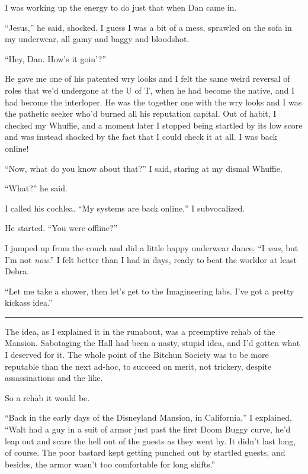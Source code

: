I was working up the energy to do just that when Dan came in.

“Jesus,” he said, shocked. I guess I was a bit of a mess, sprawled
on the sofa in my underwear, all gamy and baggy and bloodshot.

“Hey, Dan. How's it goin'?”

He gave me one of his patented wry looks and I felt the same weird
reversal of roles that we'd undergone at the U of T, when he had
become the native, and I had become the interloper. He was the
together one with the wry looks and I was the pathetic seeker who'd
burned all his reputation capital. Out of habit, I checked my
Whuffie, and a moment later I stopped being startled by its low
score and was instead shocked by the fact that I could check it at
all. I was back online!

“Now, what do you know about that?” I said, staring at my dismal
Whuffie.

“What?” he said.

I called his cochlea. “My systems are back online,” I
subvocalized.

He started. “You were offline?”

I jumped up from the couch and did a little happy underwear dance.
“I \emph{was}, but I'm not \emph{now}.” I felt better than I had in
days, ready to beat the world{\dash}or at least Debra.

“Let me take a shower, then let's get to the Imagineering labs.
I've got a pretty kickass idea.”

\begin{center}\rule{1in}{0.4pt}\end{center}

The idea, as I explained it in the runabout, was a preemptive rehab
of the Mansion. Sabotaging the Hall had been a nasty, stupid idea,
and I'd gotten what I deserved for it. The whole point of the
Bitchun Society was to be more reputable than the next ad-hoc, to
succeed on merit, not trickery, despite assassinations and the
like.

So a rehab it would be.

“Back in the early days of the Disneyland Mansion, in California,”
I explained, “Walt had a guy in a suit of armor just past the first
Doom Buggy curve, he'd leap out and scare the hell out of the
guests as they went by. It didn't last long, of course. The poor
bastard kept getting punched out by startled guests, and besides,
the armor wasn't too comfortable for long shifts.”

